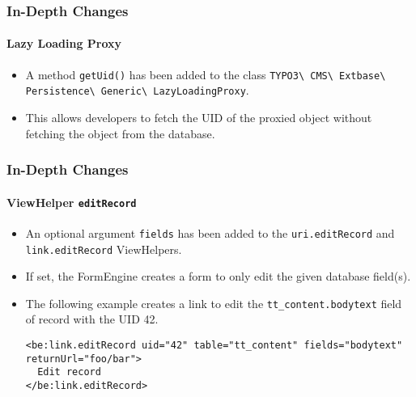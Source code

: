 
\begin{frame}[fragile]
	\frametitle{In-Depth Changes}
	\framesubtitle{Lazy Loading Proxy}

	\lstset{basicstyle=\tiny\ttfamily}

	\begin{itemize}
		\item A method \texttt{getUid()} has been added to the class\newline
			\texttt{TYPO3\textbackslash
				CMS\textbackslash
				Extbase\textbackslash
				Persistence\textbackslash
				Generic\textbackslash
				LazyLoadingProxy}.
		\item This allows developers to fetch the UID of the proxied object without fetching the object from the database.

	\end{itemize}

\end{frame}


\begin{frame}[fragile]
	\frametitle{In-Depth Changes}
	\framesubtitle{ViewHelper \texttt{editRecord}}

	\lstset{basicstyle=\tiny\ttfamily}

	\begin{itemize}
		\item An optional argument \texttt{fields} has been added to the
			\texttt{uri.editRecord} and \texttt{link.editRecord} ViewHelpers.
		\item If set, the FormEngine creates a form to only edit the given database field(s).
		\item The following example creates a link to edit the \texttt{tt\_content.bodytext}
			field of record with the UID 42.
\begin{lstlisting}
<be:link.editRecord uid="42" table="tt_content" fields="bodytext" returnUrl="foo/bar">
  Edit record
</be:link.editRecord>
\end{lstlisting}

	\end{itemize}

\end{frame}

